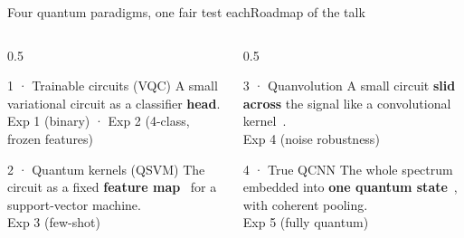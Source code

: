 \begin{frame}{Four quantum paradigms, one fair test each}{Roadmap of the talk}
    \begin{columns}[T]
        \begin{column}{0.5\textwidth}
            \begin{block}{1 · Trainable circuits (VQC)}
                A small variational circuit as a classifier \textbf{head}.
                \\[2pt]\footnotesize Exp 1 (binary) · Exp 2 (4-class, frozen features)
            \end{block}
            \begin{block}{2 · Quantum kernels (QSVM)}
                The circuit as a fixed \textbf{feature
                    map}~\cite{havlicek2019,schuld2019feature} for a support-vector
                machine.
                \\[2pt]\footnotesize Exp 3 (few-shot)
            \end{block}
        \end{column}
        \begin{column}{0.5\textwidth}
            \begin{block}{3 · Quanvolution}
                A small circuit \textbf{slid across} the signal like a convolutional
                kernel~\cite{henderson2020quanvolutional}.
                \\[2pt]\footnotesize Exp 4 (noise robustness)
            \end{block}
            \begin{block}{4 · True QCNN}
                The whole spectrum embedded into \textbf{one quantum
                    state}~\cite{cong2019qcnn}, with coherent pooling.
                \\[2pt]\footnotesize Exp 5 (fully quantum)
            \end{block}
        \end{column}
    \end{columns}
    \vspace{2pt}
\end{frame}
